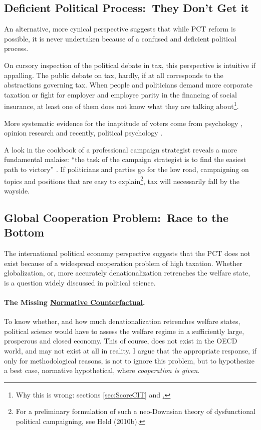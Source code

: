 \subsection[Deficient Political Process]{Deficient Political Process:\ They Don't Get it}
An alternative, more cynical perspective suggests that while PCT reform is possible, it is never undertaken because of a confused and deficient political process.

On cursory inspection of the political debate in tax, this perspective is intuitive if appalling.
The public debate on tax, hardly, if at all corresponds to the abstractions governing tax.
When people and politicians demand more corporate taxation or fight for employer and employee parity in the financing of social insurance, at least one of them does not know what they are talking about\footnote{Why this is wrong:
sections \ref{sec:ScoreCIT} and \href{sec:SICAreTaxes}.}.

More systematic evidence for the inaptitude of voters come from psychology \citep{Converse-1970-aa}, opinion research \citep{Delli-CarpiniKeeter-1996-aa} and recently, political psychology \citep{Rosenberg-2002-aa}.

A look in the cookbook of a professional campaign strategist reveals a more fundamental malaise:
``the task of the campaign strategist is to find the easiest path to victory'' \citep[9]{Malchow2003}.
If politicians and parties go for the low road, campaigning on topics and positions that are easy to explain\footnote{For a preliminary formulation of such a neo-Downsian theory of dysfunctional political campaigning, see Held (2010b).}, tax will necessarily fall by the wayside.

\subsection[Global Cooperation Problem]{Global Cooperation Problem:\ Race to the Bottom}
The international political economy perspective suggests that the PCT does not exist because of a widespread cooperation problem of high taxation.
Whether globalization, or, more accurately denationalization retrenches the welfare state, is a question widely discussed in political science.


\paragraph{The Missing \href{http://maxheld.de/2009/10/13/setting-goalposts/}{Normative Counterfactual}.}
To know whether, and how much denationalization retrenches welfare states, political science would have to assess the welfare regime in a sufficiently large, prosperous and closed economy.
This of course, does not exist in the OECD world, and may not exist at all in reality.
I argue that the appropriate response, if only for methodological reasons, is not to ignore this problem, but to hypothesize a best case, normative hypothetical, where \emph{cooperation is given}.

